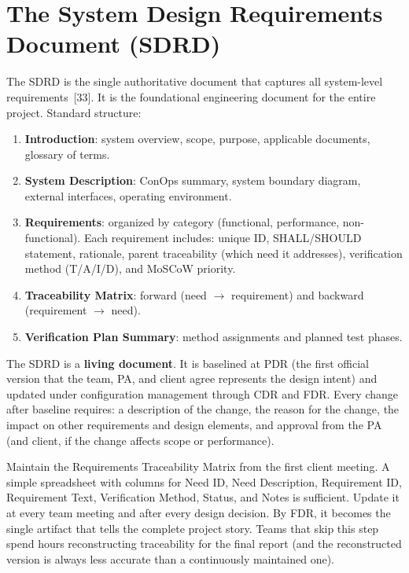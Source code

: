 \section{The System Design Requirements Document (SDRD)}
The SDRD is the single authoritative document that captures all system-level requirements~[33]. It is the foundational engineering document for the entire project. Standard structure:

\begin{enumerate}[nosep,leftmargin=1.5em]
\item \textbf{Introduction}: system overview, scope, purpose, applicable documents, glossary of terms.
\item \textbf{System Description}: ConOps summary, system boundary diagram, external interfaces, operating environment.
\item \textbf{Requirements}: organized by category (functional, performance, non-functional). Each requirement includes: unique ID, SHALL/SHOULD statement, rationale, parent traceability (which need it addresses), verification method (T/A/I/D), and MoSCoW priority.
\item \textbf{Traceability Matrix}: forward (need $\to$ requirement) and backward (requirement $\to$ need).
\item \textbf{Verification Plan Summary}: method assignments and planned test phases.
\end{enumerate}

The SDRD is a \textbf{living document}. It is baselined at PDR (the first official version that the team, PA, and client agree represents the design intent) and updated under configuration management through CDR and FDR. Every change after baseline requires: a description of the change, the reason for the change, the impact on other requirements and design elements, and approval from the PA (and client, if the change affects scope or performance).

\begin{tipbox}
Maintain the Requirements Traceability Matrix from the first client meeting. A simple spreadsheet with columns for Need ID, Need Description, Requirement ID, Requirement Text, Verification Method, Status, and Notes is sufficient. Update it at every team meeting and after every design decision. By FDR, it becomes the single artifact that tells the complete project story. Teams that skip this step spend hours reconstructing traceability for the final report (and the reconstructed version is always less accurate than a continuously maintained one).
\end{tipbox}

